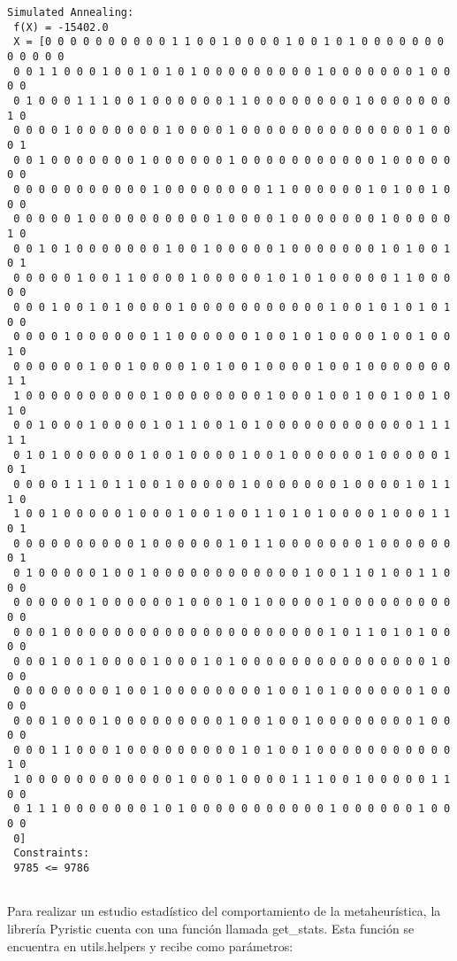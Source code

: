 \documentclass[11pt]{article}
\begin{document}
    \begin{Verbatim}[commandchars=\\\{\}]
Simulated Annealing: 
 f(X) = -15402.0 
 X = [0 0 0 0 0 0 0 0 0 0 1 1 0 0 1 0 0 0 0 1 0 0 1 0 1 0 0 0 0 0 0 0 0 0 0 0 0
 0 0 1 1 0 0 0 1 0 0 1 0 1 0 1 0 0 0 0 0 0 0 0 0 1 0 0 0 0 0 0 0 1 0 0 0 0
 0 1 0 0 0 1 1 1 0 0 1 0 0 0 0 0 0 1 1 0 0 0 0 0 0 0 0 1 0 0 0 0 0 0 0 1 0
 0 0 0 0 1 0 0 0 0 0 0 0 1 0 0 0 0 1 0 0 0 0 0 0 0 0 0 0 0 0 0 0 1 0 0 0 1
 0 0 1 0 0 0 0 0 0 0 1 0 0 0 0 0 0 1 0 0 0 0 0 0 0 0 0 0 0 1 0 0 0 0 0 0 0
 0 0 0 0 0 0 0 0 0 0 0 1 0 0 0 0 0 0 0 0 1 1 0 0 0 0 0 0 1 0 1 0 0 1 0 0 0
 0 0 0 0 0 1 0 0 0 0 0 0 0 0 0 0 1 0 0 0 0 1 0 0 0 0 0 0 0 1 0 0 0 0 0 1 0
 0 0 1 0 1 0 0 0 0 0 0 0 1 0 0 1 0 0 0 0 0 1 0 0 0 0 0 0 0 1 0 1 0 0 1 0 1
 0 0 0 0 0 1 0 0 1 1 0 0 0 0 1 0 0 0 0 0 1 0 1 0 1 0 0 0 0 0 1 1 0 0 0 0 0
 0 0 0 1 0 0 1 0 1 0 0 0 0 1 0 0 0 0 0 0 0 0 0 0 0 1 0 0 1 0 1 0 1 0 1 0 0
 0 0 0 0 1 0 0 0 0 0 0 1 1 0 0 0 0 0 0 1 0 0 1 0 1 0 0 0 0 1 0 0 1 0 0 1 0
 0 0 0 0 0 0 1 0 0 1 0 0 0 0 1 0 1 0 0 1 0 0 0 0 1 0 0 1 0 0 0 0 0 0 0 1 1
 1 0 0 0 0 0 0 0 0 0 0 1 0 0 0 0 0 0 0 0 1 0 0 0 1 0 0 1 0 0 1 0 0 1 0 1 0
 0 0 1 0 0 0 1 0 0 0 0 1 0 1 1 0 0 1 0 1 0 0 0 0 0 0 0 0 0 0 0 0 1 1 1 1 1
 0 1 0 1 0 0 0 0 0 0 1 0 0 1 0 0 0 0 1 0 0 1 0 0 0 0 0 0 1 0 0 0 0 0 1 0 1
 0 0 0 0 1 1 1 0 1 1 0 0 1 0 0 0 0 0 1 0 0 0 0 0 0 0 1 0 0 0 0 1 0 1 1 1 0
 1 0 0 1 0 0 0 0 0 1 0 0 0 1 0 0 1 0 0 1 1 0 1 0 1 0 0 0 0 1 0 0 0 1 1 0 1
 0 0 0 0 0 0 0 0 0 0 1 0 0 0 0 0 0 1 0 1 1 0 0 0 0 0 0 0 1 0 0 0 0 0 0 0 1
 0 1 0 0 0 0 0 1 0 0 1 0 0 0 0 0 0 0 0 0 0 0 0 1 0 0 1 1 0 1 0 0 1 1 0 0 0
 0 0 0 0 0 0 1 0 0 0 0 0 0 1 0 0 0 1 0 1 0 0 0 0 0 1 0 0 0 0 0 0 0 0 0 0 0
 0 0 0 1 0 0 0 0 0 0 0 0 0 0 0 0 0 0 0 0 0 0 0 0 0 1 0 1 1 0 1 0 1 0 0 0 0
 0 0 0 1 0 0 1 0 0 0 0 1 0 0 0 1 0 1 0 0 0 0 0 0 0 0 0 0 0 0 0 0 0 1 0 0 0
 0 0 0 0 0 0 0 0 1 0 0 1 0 0 0 0 0 0 0 0 1 0 0 1 0 1 0 0 0 0 0 0 1 0 0 0 0
 0 0 0 1 0 0 0 1 0 0 0 0 0 0 0 0 0 1 0 0 1 0 0 1 0 0 0 0 0 0 0 0 1 0 0 0 0
 0 0 0 1 1 0 0 0 1 0 0 0 0 0 0 0 0 0 1 0 1 0 0 1 0 0 0 0 0 0 0 0 0 0 0 1 0
 1 0 0 0 0 0 0 0 0 0 0 0 0 1 0 0 0 1 0 0 0 0 1 1 1 0 0 1 0 0 0 0 0 1 1 0 0
 0 1 1 1 0 0 0 0 0 0 0 1 0 1 0 0 0 0 0 0 0 0 0 0 0 1 0 0 0 0 0 0 1 0 0 0 0
 0] 
 Constraints: 
 9785 <= 9786 


    \end{Verbatim}

    Para realizar un estudio estadístico del comportamiento de la
metaheurística, la librería Pyristic cuenta con una función llamada
get\_stats. Esta función se encuentra en utils.helpers y recibe como
parámetros:
\end{document}

